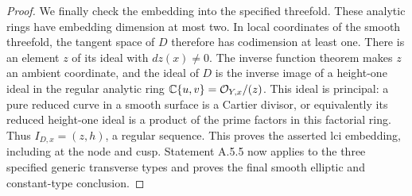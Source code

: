 \begin{proof}
We finally check the embedding into the specified
threefold. These analytic rings have embedding
dimension at most two. In local coordinates of the
smooth threefold, the tangent space of $D$ therefore
has codimension at least one. There is an element
$z$ of its ideal with $dz(x)\ne0$. The inverse
function theorem makes $z$ an ambient coordinate,
and the ideal of $D$ is the inverse image of a
height-one ideal in the regular analytic ring
$\mathbb C\{u,v\}=\mathcal O_{Y,x}/(z)$. This ideal is principal:
a pure reduced curve in a smooth surface is a Cartier
divisor, or equivalently its reduced height-one ideal
is a product of the prime factors in this factorial
ring. Thus $I_{D,x}=(z,h)$, a regular sequence.
This proves the asserted lci embedding, including
at the node and cusp. Statement A.5.5 now applies
to the three specified generic transverse types
and proves the final smooth elliptic and constant-type
conclusion.
\end{proof}



